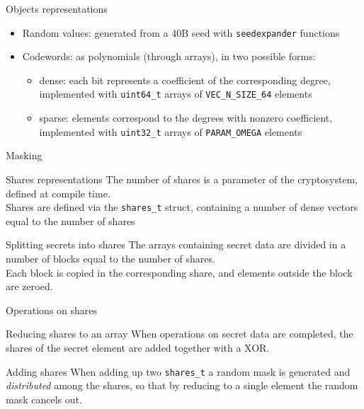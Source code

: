 \begin{frame}{Objects representations}
    \begin{block}{}
        \begin{itemize}
            \item Random values: generated from a 40B seed with \texttt{seedexpander} functions
            \item Codewords: as polynomials (through arrays), in two possible forms:
            \begin{itemize}
                \item dense: each bit represents a coefficient of the corresponding degree, implemented with \texttt{uint64\_t} arrays of \texttt{VEC\_N\_SIZE\_64} elements
                \item sparse: elements correspond to the degrees with nonzero coefficient, implemented with \texttt{uint32\_t} arrays of \texttt{PARAM\_OMEGA} elements
            \end{itemize}
        \end{itemize}
    \end{block}
\end{frame}

\begin{frame}{Masking}
    \begin{block}{Shares representations}
        The number of shares is a parameter of the cryptosystem, defined at compile time.\\
        Shares are defined via the \texttt{shares\_t} struct, containing a number of dense vectors equal to the number of shares
    \end{block}
    \begin{block}{Splitting secrets into shares}
        The arrays containing secret data are divided in a number of blocks equal to the number of shares.\\
        Each block is copied in the corresponding share, and elements outside the block are zeroed.
    \end{block}
\end{frame}

\begin{frame}{Operations on shares}
    \begin{block}{Reducing shares to an array}
        When operations on secret data are completed, the shares of the secret element are added together with a XOR.
    \end{block}
    \begin{block}{Adding shares}
        When adding up two \texttt{shares\_t} a random mask is generated and \textit{distributed} among the shares, so that by reducing to a single element
        the random mask cancels out.
    \end{block}
\end{frame}

